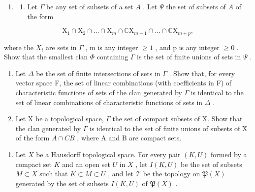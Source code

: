 \begin{enumerate}
\def\labelenumi{\arabic{enumi})}
\setcounter{enumi}{10}
\tightlist
\item
  \begin{enumerate}
  \def\labelenumii{\alph{enumii})}
  \tightlist
  \item
    Let \(\Gamma\) be any set of subsets of a set \(A\) . Let \(\Psi\) the set of subsets of \(A\) of the form
  \end{enumerate}
\end{enumerate}

\[
\mathrm{X} _ {1} \cap \mathrm{X} _ {2} \cap \dots \cap \mathrm{X} _ {m} \cap \mathbb {C} \mathrm{X} _ {m + 1} \cap \dots \cap \mathbb {C} \mathrm{X} _ {m + p},
\]

where the \(X_{i}\) are sets in \(\Gamma\) , m is any integer \(\geqslant 1\) , and p is any integer \(\geqslant 0\) . Show that the smallest clan \(\Phi\) containing \(\Gamma\) is the set of finite unions of sets in \(\Psi\) .

\begin{enumerate}
\def\labelenumi{\alph{enumi})}
\setcounter{enumi}{1}
\item
  Let \(\Delta\) be the set of finite intersections of sets in \(\Gamma\) . Show that, for every vector space F, the set of linear combinations (with coefficients in F) of characteristic functions of sets of the clan generated by \(\Gamma\) is identical to the set of linear combinations of characteristic functions of sets in \(\Delta\) .
\item
  Let X be a topological space, \(\Gamma\) the set of compact subsets of X. Show that the clan generated by \(\Gamma\) is identical to the set of finite unions of subsets of X of the form \(A \cap CB\) , where A and B are compact sets.
\end{enumerate}

\begin{enumerate}
\def\labelenumi{\arabic{enumi})}
\setcounter{enumi}{11}
\tightlist
\item
  Let \(X\) be a Hausdorff topological space. For every pair \((K, U)\) formed by a compact set \(K\) and an open set \(U\) in \(X\) , let \(I(K, U)\) be the set of subsets \(M \subset X\) such that \(K \subset M \subset U\) , and let \(\mathcal{T}\) be the topology on \(\mathfrak{P}(X)\) generated by the set of subsets \(I(K, U)\) of \(\mathfrak{P}(X)\) .
\end{enumerate}

